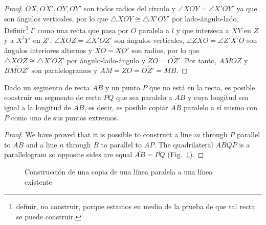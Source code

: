 {\begin{proof}
$\overline{OX}, \overline{OX'}, \overline{OY}, \overline{OY'}$ son todos radios del círculo y $\angle XOY = \angle X'OY'$ ya que son ángulos verticales, por lo que $\triangle XOY\cong\triangle X'OY'$ por lado-ángulo-lado. Definir\footnote{definir, no construir, porque estamos en medio de la prueba de que tal recta se puede construir.} $l'$ como una recta que pasa por $O$ paralela a $l$ y que interseca a $\overline{XY}$ en $Z$ y a $\overline{X'Y'}$ en $Z'$. $\angle XOZ=\angle X'OZ'$ son ángulos verticales, $\angle ZXO=\angle Z'X'O$ son ángulos interiores alternos y $\overline{XO}=\overline{XO'}$ son radios, por lo que $\triangle XOZ\cong\triangle X'OZ'$ por ángulo-lado-ángulo y $\overline{ZO}=\overline{OZ'}$. Por tanto, $\overline{AMOZ}$ y $\overline{BMOZ'}$ son paralelogramos y $\overline{AM}=\overline{ZO}=\overline{OZ'}=\overline{MB}$.
\end{proof}

\begin{theorem}\label{thm.parallel-equal}
Dado un segmento de recta $\overline{AB}$ y un punto $P$ que no está en la recta, es posible construir un segmento de recta $\overline{PQ}$ que sea paralelo a $\overline{AB}$ y cuya longitud sea igual a la longitud de $\overline{AB}$, es decir, es posible copiar $\overline{AB}$ paralelo a sí mismo con $P$ como uno de sus puntos extremos.
\end{theorem}

\begin{proof}
We have proved that it is possible to construct a line $m$ through $P$ parallel to $\overline{AB}$ and a line $n$ through $B$ to parallel to $\overline{AP}$. The quadrilateral $\overline{ABQP}$ is a parallelogram so opposite sides are equal $\overline{AB}=\overline{PQ}$ (Fig.~\ref{f.se-parallel-other4}).
\end{proof}

\begin{figure}[t]
\begin{center}
\end{center}
\caption{Construcción de una copia de una línea paralela a una línea existente}\label{f.se-parallel-other4}
\end{figure}

}
